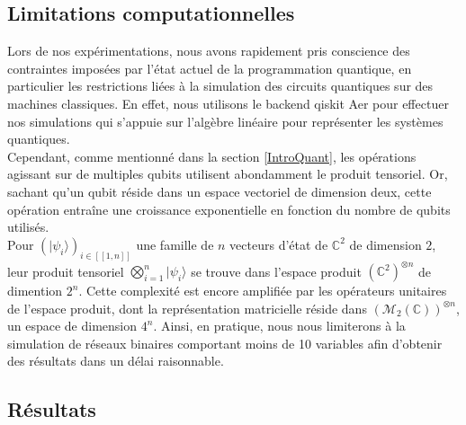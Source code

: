 \subsection{Limitations computationnelles}

Lors de nos expérimentations, nous avons rapidement pris conscience des contraintes imposées par l'état actuel de la programmation quantique, en particulier les restrictions liées à la simulation des circuits quantiques sur des machines classiques. En effet, nous utilisons le backend qiskit Aer pour effectuer nos simulations qui s'appuie sur l'algèbre linéaire pour représenter les systèmes quantiques.
\\
Cependant, comme mentionné dans la section \ref{IntroQuant}, les opérations agissant sur de multiples qubits utilisent abondamment le produit tensoriel. Or, sachant qu'un qubit réside dans un espace vectoriel de dimension deux, cette opération entraîne une croissance exponentielle en fonction du nombre de qubits utilisés.
\\
Pour $(|\psi_i\rangle)_{i \in [\![1,n]\!]}$ une famille de $n$ vecteurs d'état de $\mathbb{C}^2$ de dimension $2$, leur produit tensoriel $\bigotimes_{i=1}^{n}|\psi_i\rangle$ se trouve dans l'espace produit $(\mathbb{C}^2)^{\otimes n}$ de dimention $2^n$. Cette complexité est encore amplifiée par  les opérateurs unitaires de l'espace produit, dont la représentation matricielle réside dans $(\mathcal{M}_2(\mathbb{C}))^{\otimes n}$,  un espace de dimension $4^n$.
Ainsi, en pratique, nous nous limiterons à la simulation de réseaux binaires comportant moins de 10 variables afin d'obtenir des résultats dans un délai raisonnable.

\subsection{Résultats}
